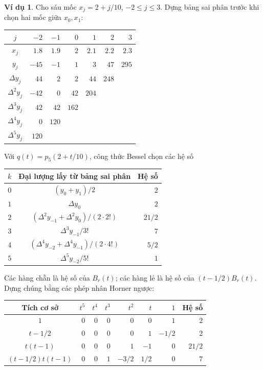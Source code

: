 \documentclass[12pt,a4paper,oneside]{book}
\numberwithin{algorithm}{chapter}
\theoremstyle{definition}
\newtheorem{vidu}{Ví dụ}[chapter]
\begin{document}
\begin{vidu}\label{vidu:central-six-table}
Cho sáu mốc $x_j=2+j/10$, $-2\leq j\leq3$. Dựng bảng sai phân trước khi chọn hai mốc giữa $x_0,x_1$:
\begin{center}
\begin{tabular}{c|rrrrrr}\toprule
$j$&$-2$&$-1$&$0$&$1$&$2$&$3$\\\midrule
$x_j$&$1.8$&$1.9$&$2$&$2.1$&$2.2$&$2.3$\\
$y_j$&$-45$&$-1$&$1$&$3$&$47$&$295$\\
$\Delta y_j$&$44$&$2$&$2$&$44$&$248$&\\
$\Delta^2y_j$&$-42$&$0$&$42$&$204$&&\\
$\Delta^3y_j$&$42$&$42$&$162$&&&\\
$\Delta^4y_j$&$0$&$120$&&&&\\
$\Delta^5y_j$&$120$&&&&&\\\bottomrule
\end{tabular}
\end{center}
Với $q(t)=p_5(2+t/10)$, công thức Bessel chọn các hệ số
\begin{center}
\small
\begin{tabular}{c|c|r}\toprule
$k$&Đại lượng lấy từ bảng sai phân&Hệ số\\\midrule
$0$&$(y_0+y_1)/2$&$2$\\
$1$&$\Delta y_0$&$2$\\
$2$&$(\Delta^2y_{-1}+\Delta^2y_0)/(2\cdot2!)$&$21/2$\\
$3$&$\Delta^3y_{-1}/3!$&$7$\\
$4$&$(\Delta^4y_{-2}+\Delta^4y_{-1})/(2\cdot4!)$&$5/2$\\
$5$&$\Delta^5y_{-2}/5!$&$1$\\\bottomrule
\end{tabular}
\end{center}
Các hàng chẵn là hệ số của $B_r(t)$; các hàng lẻ là hệ số của $(t-1/2)B_r(t)$. Dựng chúng bằng các phép nhân Horner ngược:
\begin{center}
\small\setlength{\tabcolsep}{5pt}
\begin{tabular}{c|rrrrrr|r}\toprule
Tích cơ sở&$t^5$&$t^4$&$t^3$&$t^2$&$t$&$1$&Hệ số\\\midrule
$1$&$0$&$0$&$0$&$0$&$0$&$1$&$2$\\
$t-1/2$&$0$&$0$&$0$&$0$&$1$&$-1/2$&$2$\\
$t(t-1)$&$0$&$0$&$0$&$1$&$-1$&$0$&$21/2$\\
$(t-1/2)t(t-1)$&$0$&$0$&$1$&$-3/2$&$1/2$&$0$&$7$\\

\end{tabular}
\end{center}
\end{vidu}
\end{document}
